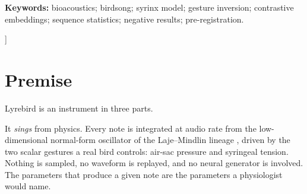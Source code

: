 \documentclass[10pt,twocolumn,a4paper]{article}
\begin{document}
\begin{@twocolumnfalse}
\begin{abstract}
sounding fit. Second, that is not hypothetical, and it is not uniform either: of the two
cosine-gated adoptions that can be re-judged without refitting, the respiratory block gained
$+0.034$ of median cosine and \emph{cost} 4.18\,dB of median distortion, improving only 33\,\%
of 175 types, while the two-voice block gained $+0.071$ and \emph{won} 1.13\,dB on 55.6\,\% of
1\,737 types. A proxy anti-correlated with fidelity across types removes the guarantee that a
gate built on it is safe; it does not make every such gate harmful. Third, the learned embedding
organises by recordist before it organises by bird, at a nearest-neighbour lift of $+0.488$
against $+0.196$, and four independent attempts to remove that confound failed --- two of them
using archive-scale external models, which disagree with each other by more than either differs
from ours. That confound has a threshold: the cost of blocking an evaluation split by recordist
falls from 30.8 points of top-1 at two recordists per species to 3.1 at six or more, and the
\emph{same individual} recordists are the identifiable ones in Perch and BirdNET alike
($r = +0.85$ partial). Fourth, with every type granted its own cluster, 0.602 of syllables have a nearest
centroid belonging to their own type. That number is the ceiling on
``sing and the right region lights''.
%
Appendix~\ref{app:ledger} lists all 58 pre-registered gates and their outcomes. 20 passed,
37 ended in a written refusal, and 1 is unrun. The refusals are as much of the contribution
as the system is.
\end{abstract}

\noindent\textbf{Keywords:} bioacoustics; birdsong; syrinx model; gesture inversion;
contrastive embeddings; sequence statistics; negative results; pre-registration.

\vspace{1.4em}
\end{@twocolumnfalse}]
\makeatother

\section{Premise}
\label{sec:premise}

Lyrebird is an instrument in three parts.

It \emph{sings} from physics. Every note is integrated at audio rate from the
low-dimensional normal-form oscillator of the Laje--Mindlin
lineage \citep{gardner2001,laje2002a,laje2002b,mindlin2005}, driven by the two
scalar gestures a real bird controls: air-sac pressure and syringeal tension. Nothing
is sampled, no waveform is replayed, and no neural generator is involved. The parameters
that produce a given note are the parameters a physiologist would name.
\end{document}
